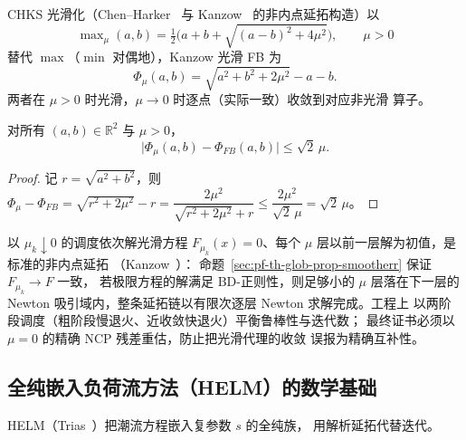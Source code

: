 \begin{definition}\label{sec:pf-th-glob-def-smoothing}
CHKS 光滑化（Chen--Harker~\cite{pfglob-chenharker} 与
Kanzow~\cite{pfglob-kanzow} 的非内点延拓构造）以
\begin{equation}
\max\nolimits_\mu(a,b)=\tfrac12\bigl(a+b+\sqrt{(a-b)^2+4\mu^2}\bigr),
\qquad \mu>0
\end{equation}
替代 $\max$（$\min$ 对偶地），Kanzow 光滑 FB 为
\begin{equation}
\Phi_\mu(a,b)=\sqrt{a^2+b^2+2\mu^2}-a-b .
\end{equation}
两者在 $\mu>0$ 时光滑，$\mu\to0$ 时逐点（实际一致）收敛到对应非光滑
算子。
\end{definition}

\begin{proposition}[光滑化的一致逼近阶]\label{sec:pf-th-glob-prop-smootherr}
对所有 $(a,b)\in\mathbb R^2$ 与 $\mu>0$，
\begin{equation}
\bigl|\Phi_\mu(a,b)-\Phi_{FB}(a,b)\bigr|\le\sqrt2\,\mu .
\end{equation}
\end{proposition}

\begin{proof}
记 $r=\sqrt{a^2+b^2}$，则
$\Phi_\mu-\Phi_{FB}=\sqrt{r^2+2\mu^2}-r
=\dfrac{2\mu^2}{\sqrt{r^2+2\mu^2}+r}\le\dfrac{2\mu^2}{\sqrt2\,\mu}
=\sqrt2\,\mu$。
\end{proof}

\begin{remark}[光滑延拓的收敛逻辑]\label{sec:pf-th-glob-rem-smoothcont}
以 $\mu_k\downarrow0$ 的调度依次解光滑方程 $F_{\mu_k}(x)=0$、每个
$\mu$ 层以前一层解为初值，是标准的非内点延拓
（Kanzow~\cite{pfglob-kanzow}）：
命题~\ref{sec:pf-th-glob-prop-smootherr} 保证 $F_{\mu_k}\to F$ 一致，
若极限方程的解满足 BD-正则性，则足够小的 $\mu$ 层落在下一层的
Newton 吸引域内，整条延拓链以有限次逐层 Newton 求解完成。工程上
以两阶段调度（粗阶段慢退火、近收敛快退火）平衡鲁棒性与迭代数；
最终证书必须以 $\mu=0$ 的精确 NCP 残差重估，防止把光滑代理的收敛
误报为精确互补性。
\end{remark}

\subsection{全纯嵌入负荷流方法（HELM）的数学基础}\label{sec:pf-th-glob-helm}

HELM（Trias~\cite{pfglob-trias}）把潮流方程嵌入复参数 $s$ 的全纯族，
用解析延拓代替迭代。

